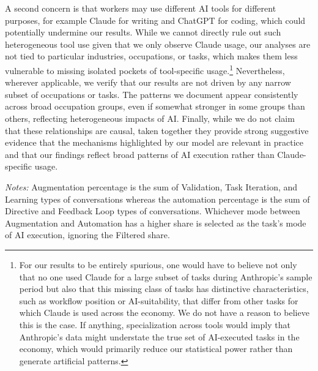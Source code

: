 A second concern is that workers may use different AI tools for different purposes, for example Claude for writing and ChatGPT for coding, which could potentially undermine our results.
While we cannot directly rule out such heterogeneous tool use given that we only observe Claude usage, our analyses are not tied to particular industries, occupations, or tasks, which makes them less vulnerable to missing isolated pockets of tool-specific usage.\footnote{
For our results to be entirely spurious, one would have to believe not only that no one used Claude for a large subset of tasks during Anthropic's sample period but also that this missing class of tasks has distinctive characteristics, such as workflow position or AI-suitability, that differ from other tasks for which Claude is used across the economy.
We do not have a reason to believe this is the case.
If anything, specialization across tools would imply that Anthropic's data might understate the true set of AI-executed tasks in the economy, which would primarily reduce our statistical power rather than generate artificial patterns.
}
Nevertheless, wherever applicable, we verify that our results are not driven by any narrow subset of occupations or tasks.
The patterns we document appear consistently across broad occupation groups, even if somewhat stronger in some groups than others, reflecting heterogeneous impacts of AI.
Finally, while we do not claim that these relationships are causal, taken together they provide strong suggestive evidence that the mechanisms highlighted by our model are relevant in practice and that our findings reflect broad patterns of AI execution rather than Claude-specific usage.


\begin{landscape}
\begin{table}[htbp]
    \caption{Example O*NET Tasks Associated with Claude Conversations, and Calculated Augmentation vs.\ Automation Outcomes}
    \label{tab:example_anthropic_AI_tasks}
    \begin{center}
    
    \end{center}
    \raggedright \footnotesize{\emph{Notes:} Augmentation percentage is the sum of Validation, Task Iteration, and Learning types of conversations whereas the automation percentage is the sum of Directive and Feedback Loop types of conversations. 
    Whichever mode between Augmentation and Automation has a higher share is selected as the task's mode of AI execution, ignoring the Filtered share.}
\end{table}
\end{landscape}


